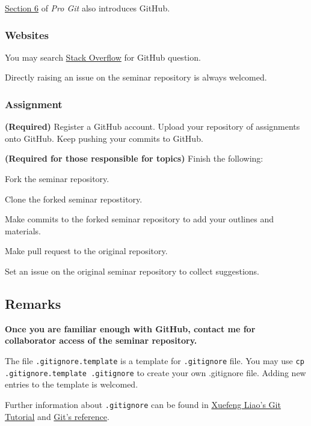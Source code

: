 \documentclass[english]{pkupaper}
\begin{document}
\href{https://git-scm.com/book/en/v2/GitHub-Account-Setup-and-Configuration}{Section 6} of \emph{Pro Git} also introduces GitHub.

\subsubsection{Websites}

You may search \href{https://stackoverflow.com/}{Stack Overflow} for GitHub question.

Directly raising an issue on the seminar repository is always welcomed.

\subsubsection{Assignment}

\begin{thmquestion}
\textbf{(Required)} Register a GitHub account. Upload your repository of assignments onto GitHub. Keep pushing your commits to GitHub.
\end{thmquestion}

\begin{thmquestion}
\textbf{(Required for those responsible for topics)} Finish the following:
\begin{partlist}
\item Fork the seminar repository.
\item Clone the forked seminar repostitory.
\item Make commits to the forked seminar repository to add your outlines and materials.
\item Make pull request to the original repository.
\item Set an issue on the original seminar repository to collect suggestions.
\end{partlist}
\end{thmquestion}

\subsection{Remarks}

\textbf{Once you are familiar enough with GitHub, contact me for collaborator access of the seminar repository.}

The file \verb".gitignore.template" is a template for \verb".gitignore" file. You may use \verb"cp .gitignore.template .gitignore" to create your own .gitignore file. Adding new entries to the template is welcomed.

Further information about \verb".gitignore" can be found in \href{https://www.liaoxuefeng.com/wiki/0013739516305929606dd18361248578c67b8067c8c017b000/0013758404317281e54b6f5375640abbb11e67be4cd49e0000}{Xuefeng Liao's Git Tutorial} and \href{https://git-scm.com/docs/gitignore}{Git's reference}.

	
\end{document}

